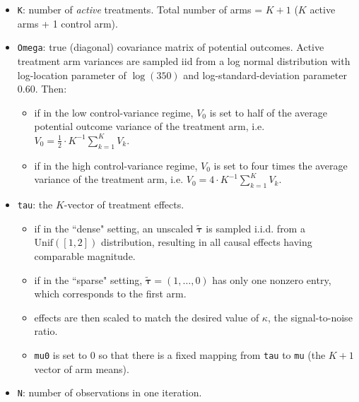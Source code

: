 \documentclass{article}
\newcommand{\bstau}{\boldsymbol \tau}
\begin{document}
\begin{itemize}
    \item \texttt{K}: number of \emph{active} treatments. Total number of arms = $K + 1$ ($K$ active arms + 1 control arm).
    \item  \texttt{Omega}: true (diagonal) covariance matrix of potential outcomes. Active treatment arm variances are sampled iid from a log normal distribution with log-location parameter of $\log(350)$ and log-standard-deviation parameter $0.60$. Then:
    \begin{itemize}
        \item if in the low control-variance regime, $V_0$ is set to half of the average potential outcome variance of the treatment arm, i.e. $V_0 = \tfrac{1}{2}\cdot K^{-1}\sum_{k=1}^K V_k$.
        \item if in the high control-variance regime, $V_0$ is set to four times the average variance of the treatment arm, i.e. $V_0 = 4\cdot K^{-1}\sum_{k=1}^K V_k$.
    \end{itemize} 
    \item \texttt{tau}: the $K$-vector of treatment effects.  %
    \begin{itemize}
        \item if in the ``dense" setting, an unscaled $\tilde{\bstau}$ is sampled i.i.d. from a $\text{Unif}([1, 2])$ distribution, resulting in all causal effects having comparable magnitude. 
        \item if in the ``sparse" setting, $\tilde{\bstau} = (1, \dots, 0)$ has only one nonzero entry, which corresponds to the first arm.
        \item effects are then scaled to match the desired value of $\kappa$, the signal-to-noise ratio. 
        \item \texttt{mu0} is set to $0$ so that there is a fixed mapping from \texttt{tau} to \texttt{mu} (the $K+1$ vector of arm means).
    \end{itemize}
    \item \texttt{N}: number of observations in one iteration.
\end{itemize}
\end{document}
